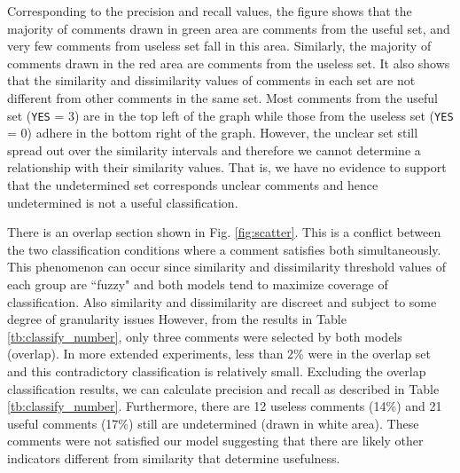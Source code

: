 Corresponding to the precision and recall values, the figure shows that the majority of comments drawn in green area are comments from the useful set, and very few comments from useless set fall in this area.
Similarly, the majority of comments drawn in the red area are comments from the useless set.
It also shows that the similarity and dissimilarity values of comments in each set are not different from other comments in the same set.
Most comments from the useful set (\texttt{YES} = 3) are in the top left of the graph
while those from the useless set (\texttt{YES} = 0) adhere in the bottom right of the graph.
However, the unclear set still spread out over the similarity intervals and therefore we cannot determine 
a relationship with their similarity values. That is, we have no evidence to support that the undetermined set corresponds unclear comments and hence undetermined is not a useful classification.

There is an overlap section shown in Fig. \ref{fig:scatter}.
This is a conflict between the two classification conditions where a comment satisfies both simultaneously.  
This phenomenon can occur since similarity and dissimilarity threshold values of each group are ``fuzzy" and both models tend to maximize coverage of classification. Also similarity and dissimilarity are discreet and subject to some degree of granularity issues 
However, from the results in Table \ref{tb:classify_number}, only three comments were selected by both models (overlap).
In more extended experiments, less than 2\% were in the overlap set and this contradictory classification is relatively small.
Excluding the overlap classification results, we can calculate precision and recall as described in Table \ref{tb:classify_number}. Furthermore, there are 12 useless comments (14\%) and 21 useful comments (17\%) still are undetermined (drawn in white area). These comments were not satisfied our model suggesting that there are likely other indicators different from similarity that determine usefulness.


